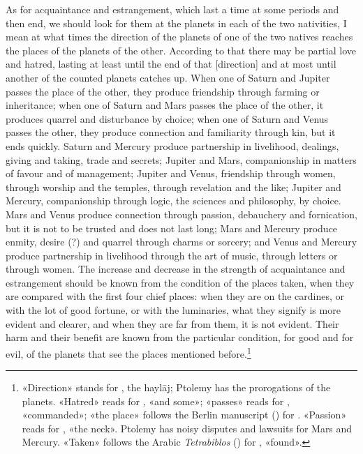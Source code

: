 \documentclass[11pt]{article}
\newcommand{\Fol}[1]{\marginpar{\footnotesize\color{gray}f.\,#1}}
\begin{document}
\par \Fol{72r}As for acquaintance and estrangement, which last a time at some periods and then end, we should look for them at the planets in each of the two nativities, I mean at what times the direction of the planets of one of the two natives reaches the places of the planets of the other. According to that there may be partial love and hatred, lasting at least until the end of that [direction] and at most until another of the counted planets catches up. When one of Saturn and Jupiter passes the place of the other, they produce friendship through farming or inheritance; when one of Saturn and Mars passes the place of the other, it produces quarrel and disturbance by choice; when one of Saturn and Venus passes the other, they produce connection and familiarity through kin, but it ends quickly. Saturn and Mercury produce partnership in livelihood, dealings, giving and taking, trade and secrets; Jupiter and Mars, companionship in matters of favour and of management; Jupiter and Venus, friendship through women, through worship and the temples, through revelation and the like; Jupiter and Mercury, companionship through logic, the sciences and philosophy, by choice. Mars and Venus produce connection through passion, debauchery and fornication, but it is not to be trusted and does not last long; Mars and Mercury produce enmity, desire (?) and quarrel through charms or sorcery; and Venus and Mercury produce partnership in livelihood through the art of music, through letters or through women. The increase and decrease in the strength of acquaintance and estrangement should be known from the condition of the places taken, when they are compared with the first four chief places: when they are on the cardines, or with the lot of good fortune, or with the luminaries, what they signify is more evident and clearer, and when they are far from them, it is not evident. Their harm and their benefit are known from the particular condition, for good and for evil, of the planets that see the places mentioned before.\footnote{«Direction» stands for , the haylāj; Ptolemy has the prorogations of the planets. «Hatred» reads  for , «and some»; «passes» reads  for , «commanded»; «the place» follows the Berlin manuscript () for . «Passion» reads  for , «the neck». Ptolemy has noisy disputes and lawsuits for Mars and Mercury. «Taken» follows the Arabic \emph{Tetrabiblos} () for , «found».}\par
\end{document}
